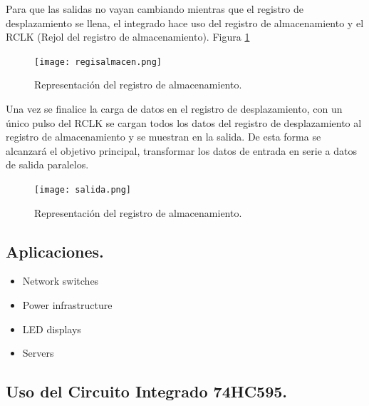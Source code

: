 \documentclass{article}
\begin{document}
Para que las salidas no vayan cambiando mientras que el registro de desplazamiento se llena, el integrado hace uso del registro de almacenamiento y el RCLK (Rejol del registro de almacenamiento). Figura \ref{fig:registroalmacenamiento}

\newpage
\begin{figure}[h]
\texttt{[image: regisalmacen.png]}
\centering
\caption{Representación del registro de almacenamiento.}
\label{fig:registroalmacenamiento}
\end{figure}

Una vez se finalice la carga de datos en el registro de desplazamiento, con un único pulso del RCLK se cargan todos los datos del registro de desplazamiento al registro de almacenamiento y se muestran en la salida. De esta forma se alcanzará el objetivo principal, transformar los datos de entrada en serie a datos de salida paralelos.

\begin{figure}[h]
\texttt{[image: salida.png]}
\centering
\caption{Representación del registro de almacenamiento.}
\label{fig:salida}
\end{figure}


\subsection{Aplicaciones.}\label{Aplicaciones}
\begin{itemize}
\item Network switches
\item Power infrastructure
\item LED displays
\item Servers
\end{itemize}

\subsection{Uso del Circuito Integrado 74HC595.}\label{Usocircuito}
\end{document}
